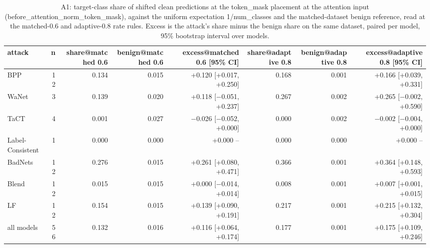 \begin{table}[htbp]
\centering
\small
\caption{A1: target-class share of shifted clean predictions at the token\_mask placement at the attention input (before_attention_norm_token_mask), against the uniform expectation 1/num\_classes and the matched-dataset benign reference, read at the matched-0.6 and adaptive-0.8 rate rules. Excess is the attack's share minus the benign share on the same dataset, paired per model, 95\% bootstrap interval over models.}
\label{tab:mech-shift-target}
\begin{adjustbox}{max width=\linewidth}
\begin{tabular}{lrrrrrrr}
\toprule
attack & n & share@matched 0.6 & benign@matched 0.6 & excess@matched 0.6 [95\% CI] & share@adaptive 0.8 & benign@adaptive 0.8 & excess@adaptive 0.8 [95\% CI] \\
\midrule
BPP & 12 & 0.134 & 0.015 & +0.120 [+0.017, +0.250] & 0.168 & 0.001 & +0.166 [+0.039, +0.331] \\
WaNet & 3 & 0.139 & 0.020 & +0.118 [$-$0.051, +0.237] & 0.267 & 0.002 & +0.265 [$-$0.002, +0.590] \\
TaCT & 4 & 0.001 & 0.027 & $-$0.026 [$-$0.052, +0.000] & 0.000 & 0.002 & $-$0.002 [$-$0.004, +0.000] \\
Label-Consistent & 1 & 0.000 & 0.000 & +0.000 -- & 0.000 & 0.000 & +0.000 -- \\
BadNets & 12 & 0.276 & 0.015 & +0.261 [+0.080, +0.471] & 0.366 & 0.001 & +0.364 [+0.148, +0.593] \\
Blend & 12 & 0.015 & 0.015 & +0.000 [$-$0.014, +0.014] & 0.008 & 0.001 & +0.007 [+0.001, +0.015] \\
LF & 12 & 0.154 & 0.015 & +0.139 [+0.090, +0.191] & 0.217 & 0.001 & +0.215 [+0.132, +0.304] \\
all models & 56 & 0.132 & 0.016 & +0.116 [+0.064, +0.174] & 0.177 & 0.001 & +0.175 [+0.109, +0.246] \\
\bottomrule
\end{tabular}
\end{adjustbox}
\end{table}
